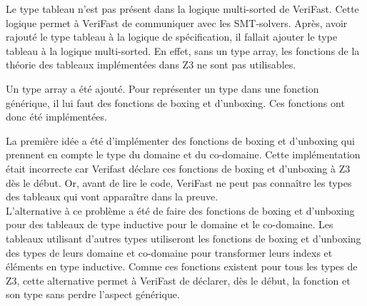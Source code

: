 \documentclass[11pt,openany]{article}
\newcommand{\verifast}{VeriFast}
\begin{document}
			Le type tableau n'est pas pr\'esent dans la logique multi-sorted de \verifast. Cette logique permet \`a \verifast{} de communiquer avec les SMT-solvers. Apr\`es, avoir rajout\'e le type tableau \`a la logique de sp\'ecification, il fallait ajouter le type tableau \`a la logique multi-sorted. En effet, sans un type array, les fonctions de la th\'eorie des tableaux impl\'ement\'ees dans Z3 ne sont pas utilisables.\par
			Un type array a \'et\'e ajout\'e. Pour repr\'esenter un type dans une fonction g\'en\'erique, il lui faut des fonctions de boxing et d'unboxing. Ces fonctions ont donc \'et\'e impl\'ement\'ees.\par 
			La premi\`ere id\'ee a \'et\'e d'impl\'ementer des fonctions de boxing et d'unboxing qui prennent en compte le type du domaine et du co-domaine. Cette impl\'ementation \'etait incorrecte car Verifast d\'eclare ces fonctions de boxing et d'unboxing \`a Z3 d\`es le d\'ebut. Or, avant de lire le code, \verifast{} ne peut pas conna\^itre les types des tableaux qui vont appara\^itre dans la preuve.\\
			L'alternative \`a ce probl\`eme a \'et\'e de faire des fonctions de boxing et d'unboxing pour des tableaux de type inductive pour le domaine et le co-domaine. Les tableaux utilisant d'autres types utiliseront les fonctions de boxing et d'unboxing des types de leurs domaine et co-domaine pour transformer leurs indexs et \'el\'ements en type inductive. Comme ces fonctions existent pour tous les types de Z3, cette alternative permet \`a \verifast{} de d\'eclarer, d\`es le d\'ebut, la fonction et son type sans perdre l'aspect g\'en\'erique.
			
			
\end{document}
